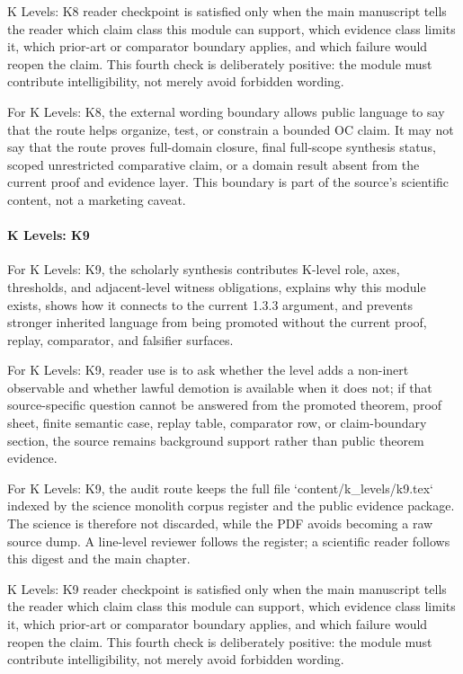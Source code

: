 K Levels: K8 reader checkpoint is satisfied only when the main manuscript tells the reader which claim class this module can support, which evidence class limits it, which prior-art or comparator boundary applies, and which failure would reopen the claim. This fourth check is deliberately positive: the module must contribute intelligibility, not merely avoid forbidden wording.


For K Levels: K8, the external wording boundary allows public language to say that the route helps organize, test, or constrain a bounded OC claim. It may not say that the route proves full-domain closure, final full-scope synthesis status, scoped unrestricted comparative claim, or a domain result absent from the current proof and evidence layer. This boundary is part of the source's scientific content, not a marketing caveat.


\paragraph{K Levels: K9}

For K Levels: K9, the scholarly synthesis contributes K-level role, axes, thresholds, and adjacent-level witness obligations, explains why this module exists, shows how it connects to the current 1.3.3 argument, and prevents stronger inherited language from being promoted without the current proof, replay, comparator, and falsifier surfaces.


For K Levels: K9, reader use is to ask whether the level adds a non-inert observable and whether lawful demotion is available when it does not; if that source-specific question cannot be answered from the promoted theorem, proof sheet, finite semantic case, replay table, comparator row, or claim-boundary section, the source remains background support rather than public theorem evidence.


For K Levels: K9, the audit route keeps the full file `content/k\_levels/k9.tex` indexed by the science monolith corpus register and the public evidence package. The science is therefore not discarded, while the PDF avoids becoming a raw source dump. A line-level reviewer follows the register; a scientific reader follows this digest and the main chapter.


K Levels: K9 reader checkpoint is satisfied only when the main manuscript tells the reader which claim class this module can support, which evidence class limits it, which prior-art or comparator boundary applies, and which failure would reopen the claim. This fourth check is deliberately positive: the module must contribute intelligibility, not merely avoid forbidden wording.


